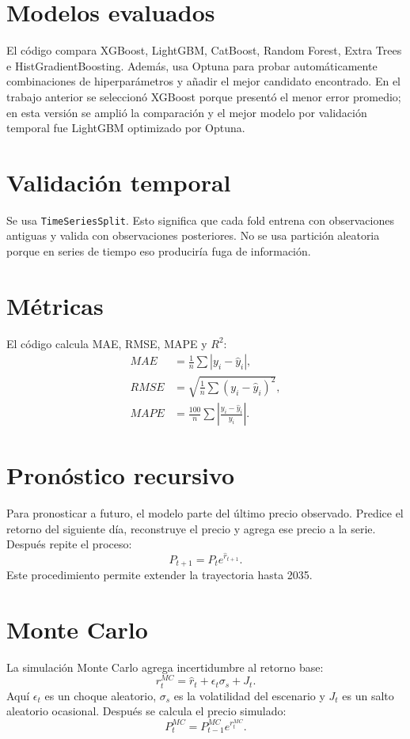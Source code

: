 \documentclass[12pt,letterpaper]{article}
\begin{document}
\section{Modelos evaluados}
El código compara XGBoost, LightGBM, CatBoost, Random Forest, Extra Trees e HistGradientBoosting. Además, usa Optuna para probar automáticamente combinaciones de hiperparámetros y añadir el mejor candidato encontrado. En el trabajo anterior se seleccionó XGBoost porque presentó el menor error promedio; en esta versión se amplió la comparación y el mejor modelo por validación temporal fue LightGBM optimizado por Optuna.

\section{Validación temporal}
Se usa \texttt{TimeSeriesSplit}. Esto significa que cada fold entrena con observaciones antiguas y valida con observaciones posteriores. No se usa partición aleatoria porque en series de tiempo eso produciría fuga de información.

\section{Métricas}
El código calcula MAE, RMSE, MAPE y $R^2$:
\begin{align}
MAE &= \frac{1}{n}\sum |y_i-\hat{y}_i|,\\
RMSE &= \sqrt{\frac{1}{n}\sum (y_i-\hat{y}_i)^2},\\
MAPE &= \frac{100}{n}\sum \left|\frac{y_i-\hat{y}_i}{y_i}\right|.
\end{align}

\section{Pronóstico recursivo}
Para pronosticar a futuro, el modelo parte del último precio observado. Predice el retorno del siguiente día, reconstruye el precio y agrega ese precio a la serie. Después repite el proceso:
\begin{equation}
P_{t+1}=P_t e^{\hat{r}_{t+1}}.
\end{equation}
Este procedimiento permite extender la trayectoria hasta 2035.

\section{Monte Carlo}
La simulación Monte Carlo agrega incertidumbre al retorno base:
\begin{equation}
r_t^{MC}=\hat{r}_t+\epsilon_t\sigma_s+J_t.
\end{equation}
Aquí $\epsilon_t$ es un choque aleatorio, $\sigma_s$ es la volatilidad del escenario y $J_t$ es un salto aleatorio ocasional. Después se calcula el precio simulado:
\begin{equation}
P_t^{MC}=P_{t-1}^{MC}e^{r_t^{MC}}.
\end{equation}
\end{document}
